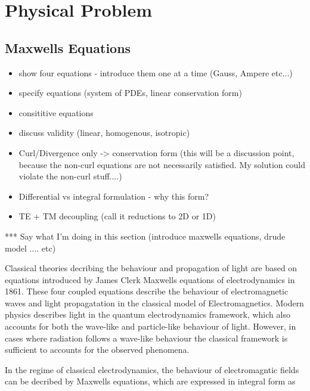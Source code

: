 %
\chapter{Physical Problem} %
\label{PhysicalProblemChapter}

\section{Maxwells Equations}

\begin{itemize}
  \item show four equations - introduce them one at a time (Gauss, Ampere etc...)
	\item specify equations (system of PDEs, linear conservation form)
  \item consititive equations
  \item discuss validity (linear, homogenous, isotropic)
	\item Curl/Divergence only -> conservation form (this will be a discussion point, because the non-curl equations are not necessarily satisfied. My solution could violate the non-curl stuff....)
	\item Differential vs integral formulation - why this form?
  \item TE + TM decoupling (call it reductions to 2D or 1D)
\end{itemize}

*** Say what I'm doing in this section (introduce maxwells equations, drude model .... etc)

Classical theories decribing the behaviour and propagation of light are based on equations introduced by James Clerk Maxwells equations of electrodynamics in 1861. These four coupled equations describe the behaviour of electromagnetic waves and light propagatation in the classical model of Electromagnetics. Modern physics describes light in the quantum electrodynamics framework, which also accounts for both the wave-like and particle-like behaviour of light. However, in cases where radiation follows a wave-like behaviour the classical framework is sufficient to accounts for the observed phenomena.

In the regime of classical electrodynamics, the behaviour of electromagntic fields can be decribed by Maxwells equations, which are expressed in integral form as

